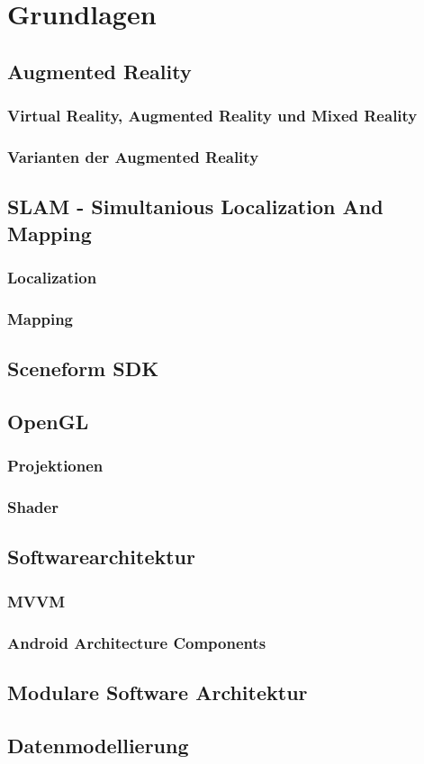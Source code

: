 
\chapter{Grundlagen}
\section{Augmented Reality}
\subsection{Virtual Reality, Augmented Reality und Mixed Reality}
\subsection{Varianten der Augmented Reality}

\section{SLAM - Simultanious Localization And Mapping}
\subsection{Localization}
\subsection{Mapping}

\section{Sceneform SDK}

\section{OpenGL}
\subsection{Projektionen}
\subsection{Shader}

\section{Softwarearchitektur}
\subsection{MVVM}
\subsection{Android Architecture Components}

\section{Modulare Software Architektur}
\section{Datenmodellierung}
